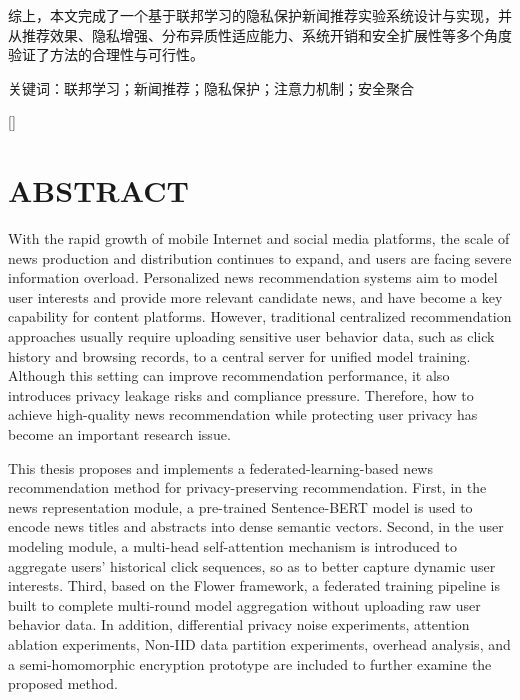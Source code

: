 \documentclass[UTF8,a4paper,12pt]{ctexart}
\numberwithin{equation}{section}
\renewcommand\thesection{\arabic{section}}
\begin{document}
综上，本文完成了一个基于联邦学习的隐私保护新闻推荐实验系统设计与实现，并从推荐效果、隐私增强、分布异质性适应能力、系统开销和安全扩展性等多个角度验证了方法的合理性与可行性。

\vspace{1em}
\noindent\heiti{}关键词：联邦学习；新闻推荐；隐私保护；注意力机制；安全聚合

\newpage
{}

\titleformat{\section}[block]{\centering\bfseries\fontspec{Times New Roman}\fontsize{16pt}{20pt}\selectfont}{\thesection}{1em}{}[]
\section*{ABSTRACT}
With the rapid growth of mobile Internet and social media platforms, the scale of news production and distribution continues to expand, and users are facing severe information overload. Personalized news recommendation systems aim to model user interests and provide more relevant candidate news, and have become a key capability for content platforms. However, traditional centralized recommendation approaches usually require uploading sensitive user behavior data, such as click history and browsing records, to a central server for unified model training. Although this setting can improve recommendation performance, it also introduces privacy leakage risks and compliance pressure. Therefore, how to achieve high-quality news recommendation while protecting user privacy has become an important research issue.

This thesis proposes and implements a federated-learning-based news recommendation method for privacy-preserving recommendation. First, in the news representation module, a pre-trained Sentence-BERT model is used to encode news titles and abstracts into dense semantic vectors. Second, in the user modeling module, a multi-head self-attention mechanism is introduced to aggregate users' historical click sequences, so as to better capture dynamic user interests. Third, based on the Flower framework, a federated training pipeline is built to complete multi-round model aggregation without uploading raw user behavior data. In addition, differential privacy noise experiments, attention ablation experiments, Non-IID data partition experiments, overhead analysis, and a semi-homomorphic encryption prototype are included to further examine the proposed method.
\end{document}
